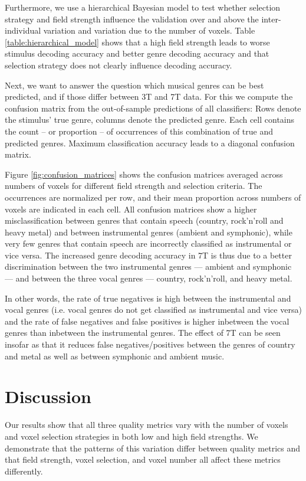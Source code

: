 Furthermore, we use a hierarchical Bayesian model to test whether selection strategy and field strength influence the validation over and above the inter-individual variation and variation due to the number of voxels.
Table \ref{table:hierarchical_model} shows that a high field strength leads to worse stimulus decoding accuracy and better genre decoding accuracy and that selection strategy does not clearly influence decoding accuracy.

Next, we want to answer the question which musical genres can be best predicted, and if those differ between 3T and 7T data. For this we compute the confusion matrix from the out-of-sample predictions of all classifiers: Rows denote the stimulus' true genre, columns denote the predicted genre. Each cell contains the count -- or proportion -- of occurrences of this combination of true and predicted genres. Maximum classification accuracy leads to a diagonal confusion matrix.

Figure \ref{fig:confusion_matrices} shows the confusion matrices averaged across numbers of voxels for different field strength and selection criteria. The occurrences are normalized per row, and their mean proportion across numbers of voxels are indicated in each cell. All confusion matrices show a higher misclassification between genres that contain speech (country, rock'n'roll and heavy metal) and between instrumental genres (ambient and symphonic), while very few genres that contain speech are incorrectly classified as instrumental or vice versa. The increased genre decoding accuracy in 7T is thus due to a better discrimination between the two instrumental genres --- ambient and symphonic --- and between the three vocal genres --- country, rock'n'roll, and heavy metal.

In other words, the rate of true negatives is high between the instrumental and vocal genres (i.e. vocal genres do not get classified as instrumental and vice versa) and the rate of false negatives and false positives is higher inbetween the vocal genres than inbetween the instrumental genres.
The effect of 7T can be seen insofar as that it reduces false negatives/positives between the genres of country and metal as well as between symphonic and ambient music.

\section*{Discussion}

Our results show that all three quality metrics vary with the number of voxels and voxel selection strategies in both low and high field strengths. We demonstrate that the patterns of this variation differ between quality metrics and that field strength, voxel selection, and voxel number all affect these metrics differently.

